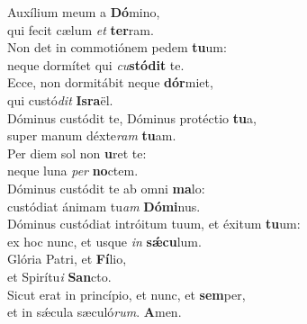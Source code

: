 \evenverse Auxílium meum a \textbf{Dó}mino,~\*\\
\evenverse qui fecit cælum \textit{et} \textbf{ter}ram.\\
\oddverse Non det in commotiónem pedem \textbf{tu}um:~\*\\
\oddverse neque dormítet qui \textit{cu}\textbf{stó}\textbf{dit} te.\\
\evenverse Ecce, non dormitábit neque \textbf{dór}miet,~\*\\
\evenverse qui custó\textit{dit} \textbf{Is}\textbf{ra}ël.\\
\oddverse Dóminus custódit te, Dóminus protéctio \textbf{tu}a,~\*\\
\oddverse super manum déxte\textit{ram} \textbf{tu}am.\\
\evenverse Per diem sol non \textbf{u}ret te:~\*\\
\evenverse neque luna \textit{per} \textbf{no}ctem.\\
\oddverse Dóminus custódit te ab omni \textbf{ma}lo:~\*\\
\oddverse custódiat ánimam tu\textit{am} \textbf{Dó}\textbf{mi}nus.\\
\evenverse Dóminus custódiat intróitum tuum, et éxitum \textbf{tu}um:~\*\\
\evenverse ex hoc nunc, et usque \textit{in} \textbf{sǽ}\textbf{cu}lum.\\
\oddverse Glória Patri, et \textbf{Fí}lio,~\*\\
\oddverse et Spirítu\textit{i} \textbf{San}cto.\\
\evenverse Sicut erat in princípio, et nunc, et \textbf{sem}per,~\*\\
\evenverse et in sǽcula sæculó\textit{rum}. \textbf{A}men.\\
